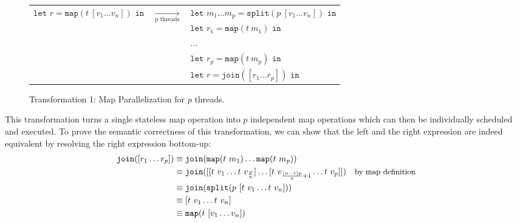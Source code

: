 \begin{figure}[h]
    \begin{tabular}{l c l}
        \multirow{5}{*}{$\texttt{let } r = \texttt{map} (t\ [v_1 \dots v_n]) \texttt{ in}$} & \multirow{5}{*}{$\underset{\text{p threads}}{\longrightarrow}$} & $\texttt{let } m_1 \dots m_p = \texttt{split} (p\ [v_1 \dots v_n]) \texttt{ in}$\\
                                                                                            &&\hspace*{.3cm} $\texttt{let } r_1 = \texttt{map} (t\ m_1) \texttt{ in}$\\
                                                                                            &&\hspace*{.6cm} $\dots$\\
                                                                                            &&\hspace*{.9cm} $\texttt{let } r_p = \texttt{map} (t\ m_p) \texttt{ in}$\\
                                                                                            &&\hspace*{1.2cm} $\texttt{let } r = \texttt{join} ([r_1 \dots r_p]) \texttt{ in}$\\
    \end{tabular}
    \caption{Transformation 1: Map Parallelization for $p$ threads.}%
    \label{fig:transformations:tf1}
\end{figure}

This transformation turns a single stateless map operation into $p$ independent map operations which can then be individually scheduled and executed.
To prove the semantic correctness of this transformation, we can show that the left and the right expression are indeed equivalent by resolving the right expression bottom-up:
\begin{align*}
    \texttt{join} ([r_1 \dots r_p]) &\equiv \texttt{join} (\texttt{map} (t\ m_1) \dots \texttt{map} (t\ m_p))\\
                                    &\equiv \texttt{join} ([[t\ v_1 \dots t\ v_{\frac{p}{n}}] \dots [t\ v_{\frac{(n-1) p}{n} + 1} \dots t\ v_p]])& \text{\small by map definition}\\
                                    &\equiv \texttt{join} (\texttt{split} (p\ [t\ v_1 \dots t\ v_n]))\\
                                    &\equiv [t\ v_1 \dots t\ v_n]\\
                                    &\equiv \texttt{map} (t\ [v_1 \dots v_n])
\end{align*}


